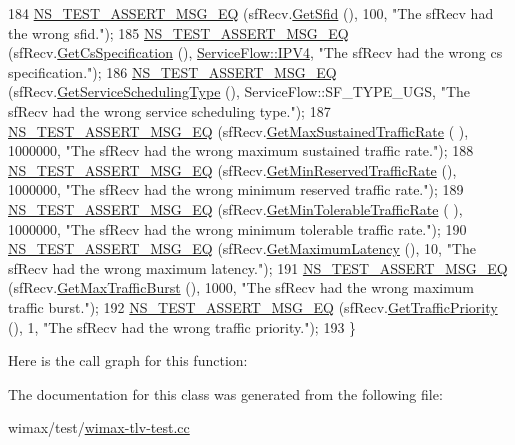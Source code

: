 \begin{DoxyCode}
184   \hyperlink{group__testing_ga2a9d78cffb3db8e867c35fff0b698cf5}{NS\_TEST\_ASSERT\_MSG\_EQ} (sfRecv.\hyperlink{classns3_1_1ServiceFlow_a3ceebc0cc381b944c902abf46804e9a0}{GetSfid} (), 100, \textcolor{stringliteral}{"The sfRecv had the wrong
       sfid."});
185   \hyperlink{group__testing_ga2a9d78cffb3db8e867c35fff0b698cf5}{NS\_TEST\_ASSERT\_MSG\_EQ} (sfRecv.\hyperlink{classns3_1_1ServiceFlow_af31954524fcd0fa30cc95387975fe20c}{GetCsSpecification} (), 
      \hyperlink{namespacens3_a79988e6e8b09f64c6ffca894994cb033af56451cc069a62c29e3d7577328b5027}{ServiceFlow::IPV4}, \textcolor{stringliteral}{"The sfRecv had the wrong cs specification."});
186   \hyperlink{group__testing_ga2a9d78cffb3db8e867c35fff0b698cf5}{NS\_TEST\_ASSERT\_MSG\_EQ} (sfRecv.\hyperlink{classns3_1_1ServiceFlow_abfcdce94a1409b4951c3cae3cad85e9a}{GetServiceSchedulingType} (), 
      ServiceFlow::SF\_TYPE\_UGS, \textcolor{stringliteral}{"The sfRecv had the wrong service scheduling type."});
187   \hyperlink{group__testing_ga2a9d78cffb3db8e867c35fff0b698cf5}{NS\_TEST\_ASSERT\_MSG\_EQ} (sfRecv.\hyperlink{classns3_1_1ServiceFlow_ad02f7733f156cfd8505c72f8e4eab836}{GetMaxSustainedTrafficRate} (
      ), 1000000, \textcolor{stringliteral}{"The sfRecv had the wrong maximum sustained traffic rate."});
188   \hyperlink{group__testing_ga2a9d78cffb3db8e867c35fff0b698cf5}{NS\_TEST\_ASSERT\_MSG\_EQ} (sfRecv.\hyperlink{classns3_1_1ServiceFlow_aa77c3b70a73e58377ff6103c8719f45c}{GetMinReservedTrafficRate} (),
       1000000, \textcolor{stringliteral}{"The sfRecv had the wrong minimum reserved traffic rate."});
189   \hyperlink{group__testing_ga2a9d78cffb3db8e867c35fff0b698cf5}{NS\_TEST\_ASSERT\_MSG\_EQ} (sfRecv.\hyperlink{classns3_1_1ServiceFlow_a6854fa39a107304708e4610a9df2053d}{GetMinTolerableTrafficRate} (
      ), 1000000, \textcolor{stringliteral}{"The sfRecv had the wrong minimum tolerable traffic rate."});
190   \hyperlink{group__testing_ga2a9d78cffb3db8e867c35fff0b698cf5}{NS\_TEST\_ASSERT\_MSG\_EQ} (sfRecv.\hyperlink{classns3_1_1ServiceFlow_ae801a50e7f8f598b4e343d85a6e6f472}{GetMaximumLatency} (), 10, \textcolor{stringliteral}{"The sfRecv
       had the wrong maximum latency."});
191   \hyperlink{group__testing_ga2a9d78cffb3db8e867c35fff0b698cf5}{NS\_TEST\_ASSERT\_MSG\_EQ} (sfRecv.\hyperlink{classns3_1_1ServiceFlow_af2314ccb8ff8fb93f537e5bccf6c16dc}{GetMaxTrafficBurst} (), 1000, \textcolor{stringliteral}{"The
       sfRecv had the wrong maximum traffic burst."});
192   \hyperlink{group__testing_ga2a9d78cffb3db8e867c35fff0b698cf5}{NS\_TEST\_ASSERT\_MSG\_EQ} (sfRecv.\hyperlink{classns3_1_1ServiceFlow_a8e818b004aeff9d7714d0774846867a5}{GetTrafficPriority} (), 1, \textcolor{stringliteral}{"The
       sfRecv had the wrong traffic priority."});
193 \}
\end{DoxyCode}


Here is the call graph for this function\+:




The documentation for this class was generated from the following file\+:\begin{DoxyCompactItemize}
\item 
wimax/test/\hyperlink{wimax-tlv-test_8cc}{wimax-\/tlv-\/test.\+cc}\end{DoxyCompactItemize}
